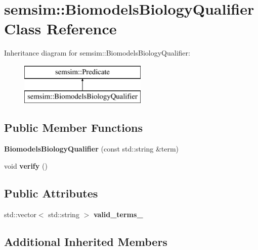 \hypertarget{classsemsim_1_1BiomodelsBiologyQualifier}{}\section{semsim\+:\+:Biomodels\+Biology\+Qualifier Class Reference}
\label{classsemsim_1_1BiomodelsBiologyQualifier}
Inheritance diagram for semsim\+:\+:Biomodels\+Biology\+Qualifier\+:\begin{figure}[H]
\begin{center}
\leavevmode
\includegraphics[height=2.000000cm]{classsemsim_1_1BiomodelsBiologyQualifier}
\end{center}
\end{figure}
\subsection*{Public Member Functions}
\begin{DoxyCompactItemize}
\item 
\mbox{\label{classsemsim_1_1BiomodelsBiologyQualifier_a0053c8e51b3a7c76ac688e7b2107eef6}} 
{\bfseries Biomodels\+Biology\+Qualifier} (const std\+::string \&term)
\item 
\mbox{\label{classsemsim_1_1BiomodelsBiologyQualifier_a356d84e018e1523321893e71a47b75ef}} 
void {\bfseries verify} ()
\end{DoxyCompactItemize}
\subsection*{Public Attributes}
\begin{DoxyCompactItemize}
\item 
std\+::vector$<$ std\+::string $>$ {\bfseries valid\+\_\+terms\+\_\+}
\end{DoxyCompactItemize}
\subsection*{Additional Inherited Members}


